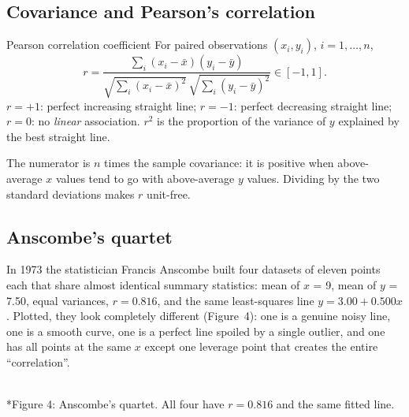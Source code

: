 \documentclass[11pt]{article}
\begin{document}
\subsection{Covariance and Pearson's correlation}
\begin{definition}{Pearson correlation coefficient}
For paired observations $(x_i,y_i)$, $i=1,\ldots,n$,
\[r=\frac{\sum_i(x_i-\bar x)(y_i-\bar y)}{\sqrt{\sum_i(x_i-\bar x)^2}\,\sqrt{\sum_i(y_i-\bar y)^2}}\in[-1,1].\]
$r=+1$: perfect increasing straight line; $r=-1$: perfect decreasing straight line; $r=0$: no \emph{linear} association. $r^2$ is the proportion of the variance of $y$ explained by the best straight line.
\end{definition}
The numerator is $n$ times the sample covariance: it is positive when above-average $x$ values tend to go with above-average $y$ values. Dividing by the two standard deviations makes $r$ unit-free.

\subsection{Anscombe's quartet}
In 1973 the statistician Francis Anscombe built four datasets of eleven points each that share almost identical summary statistics: mean of $x$ = 9, mean of $y$ = 7.50, equal variances, $r=0.816$, and the same least-squares line $y=3.00+0.500x$. Plotted, they look completely different (Figure~4): one is a genuine noisy line, one is a smooth curve, one is a perfect line spoiled by a single outlier, and one has all points at the same $x$ except one leverage point that creates the entire ``correlation''.

\begin{center}\\*{\small\color{GreyN}Figure 4: Anscombe's quartet. All four have $r=0.816$ and the same fitted line.}\end{center}
\end{document}
